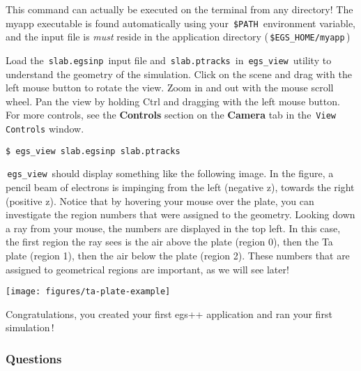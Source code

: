 \documentclass[12pt,twoside]{article}
\begin{document}
This command can actually be executed on the terminal from any directory! The myapp executable is found automatically using your \,\Verb|$PATH|\, environment variable, and the input file is \textit{must} reside in the application directory (\,\Verb|$EGS_HOME/myapp|\,)

Load the \,\Verb|slab.egsinp|\, input file and \,\Verb|slab.ptracks|\, in
\,\Verb|egs_view|\, utility to understand the geometry of the simulation.
Click on the scene and drag with the left mouse button to rotate the view.
Zoom in and out with the mouse scroll wheel. Pan
the view by holding Ctrl and dragging with the left mouse button. For more controls, see the \textbf{Controls} section on the \textbf{Camera} tab in the \,\Verb|View Controls| window.

\begin{lstlisting}
$ egs_view slab.egsinp slab.ptracks
\end{lstlisting}

\,\Verb|egs_view|\, should display something
like the following image. In the figure, a pencil beam of electrons is impinging
from the left (negative z), towards the right (positive z).
Notice that by hovering your mouse over the plate, you
can investigate the region numbers that were assigned to the geometry. Looking
down a ray from your mouse, the numbers are displayed in the top left. In this
case, the first region the ray sees is the air above the plate (region 0), then
the Ta plate (region 1), then the air below the plate (region 2). These numbers
that are assigned to geometrical regions are important, as we will see later!

\begin{center}
\texttt{[image: figures/ta-plate-example]}
\end{center}

Congratulations, you created your first egs++ application and ran
your first simulation\,!

\subsubsection{Questions}
\end{document}

